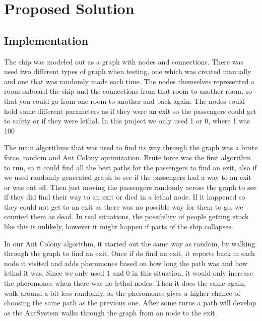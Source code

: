 \chapter{Proposed Solution}
\label{ch:solution}


\section{Implementation}

The ship was modeled out as a graph with nodes and connections. There was used two different types of graph when testing, one which was created manually and one that was randomly made each time. The nodes themselves represented a room onboard the ship and the connections from that room to another room, so that you could go from one room to another and back again. The nodes could hold some different parameters as if they were an exit so the passengers could get to safety or if they were lethal. In this project we only used 1 or 0, where 1 was 100%

The main algorithms that was used to find its way through the graph was a brute force, random and Ant Colony optimization. Brute force was the first algorithm to run, so it could find all the best paths for the passengers to find an exit, also if we used randomly generated graph to see if the passengers had a way to an exit or was cut off. Then just moving the passengers randomly across the graph to see if they did find their way to an exit or died in a lethal node. If it happened so they could not get to an exit as there was no possible way for them to go, we counted them as dead. In real situations, the possibility of people getting stuck like this is unlikely, however it might happen if parts of the ship collapses.

In our Ant Colony algorithm, it started out the same way as random, by walking through the graph to find an exit. Once if do find an exit, it reports back in each node it visited and adds pheromones based on how long the path was and how lethal it was. Since we only used 1 and 0 in this situation, it would only increase the pheromones when there was no lethal nodes. Then it does the same again, walk around a bit less randomly, as the pheromones gives a higher chance of choosing the same path as the previous one. After some turns a path will develop as the AntSystem walks through the graph from an node to the exit.

